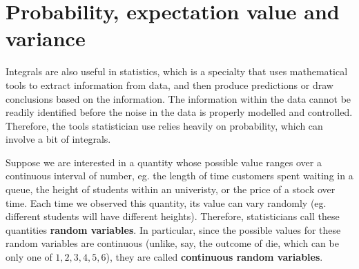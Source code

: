 \section{Probability, expectation value and variance}
Integrals are also useful in statistics, which is a specialty that uses mathematical tools to extract information from data, and then produce predictions or draw conclusions based on the information.  The information within the data cannot be readily identified before the noise in the data is properly modelled and controlled.  Therefore, the tools statistician use relies heavily on probability, which can involve a bit of integrals.

Suppose we are interested in a quantity whose possible value ranges over a continuous interval of number, eg. the length of time customers spent waiting in a queue, the height of students within an univeristy, or the price of a stock over time.  Each time we observed this quantity, its value can vary randomly (eg. different students will have different heights).  Therefore, statisticians call these quantities \textbf{random variables}.  In particular, since the possible values for these random variables are continuous (unlike, say, the outcome of die, which can be only one of $1,2,3,4,5,6$), they are called \textbf{continuous random variables}. 

